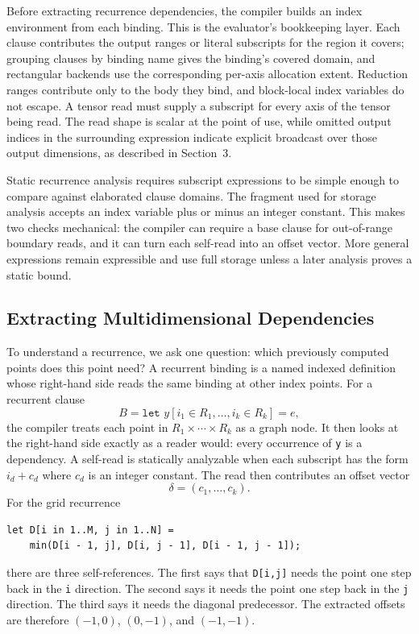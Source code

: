 \documentclass[sigplan,screen,nonacm]{acmart}
\begin{document}
Before extracting recurrence dependencies, the compiler builds an index environment from each binding. This is the evaluator's bookkeeping layer. Each clause contributes the output ranges or literal subscripts for the region it covers; grouping clauses by binding name gives the binding's covered domain, and rectangular backends use the corresponding per-axis allocation extent. Reduction ranges contribute only to the body they bind, and block-local index variables do not escape. A tensor read must supply a subscript for every axis of the tensor being read. The read shape is scalar at the point of use, while omitted output indices in the surrounding expression indicate explicit broadcast over those output dimensions, as described in Section~3.

Static recurrence analysis requires subscript expressions to be simple enough to compare against elaborated clause domains. The fragment used for storage analysis accepts an index variable plus or minus an integer constant. This makes two checks mechanical: the compiler can require a base clause for out-of-range boundary reads, and it can turn each self-read into an offset vector. More general expressions remain expressible and use full storage unless a later analysis proves a static bound.

\subsection{Extracting Multidimensional Dependencies}

To understand a recurrence, we ask one question: which previously computed points does this point need? A recurrent binding is a named indexed definition whose right-hand side reads the same binding at other index points. For a recurrent clause
\[
B = \texttt{let } y[i_1 \in R_1,\ldots,i_k \in R_k] = e,
\]
the compiler treats each point in $R_1 \times \cdots \times R_k$ as a graph node. It then looks at the right-hand side exactly as a reader would: every occurrence of \texttt{y} is a dependency. A self-read is statically analyzable when each subscript has the form $i_d + c_d$ where $c_d$ is an integer constant. The read then contributes an offset vector
\[
\delta = (c_1,\ldots,c_k).
\]
For the grid recurrence
\begin{lstlisting}[style=einlang]
let D[i in 1..M, j in 1..N] =
    min(D[i - 1, j], D[i, j - 1], D[i - 1, j - 1]);
\end{lstlisting}
there are three self-references. The first says that \texttt{D[i,j]} needs the point one step back in the \texttt{i} direction. The second says it needs the point one step back in the \texttt{j} direction. The third says it needs the diagonal predecessor. The extracted offsets are therefore $(-1,0)$, $(0,-1)$, and $(-1,-1)$.
\end{document}
